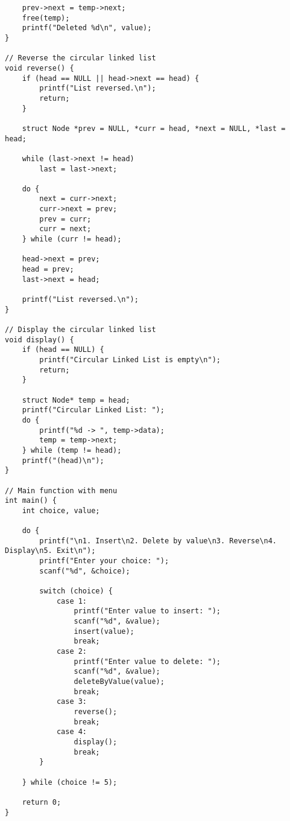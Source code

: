 \documentclass[12pt,a4paper]{article}
\begin{document}
\begin{lstlisting}
    prev->next = temp->next;
    free(temp);
    printf("Deleted %d\n", value);
}

// Reverse the circular linked list
void reverse() {
    if (head == NULL || head->next == head) {
        printf("List reversed.\n");
        return;
    }

    struct Node *prev = NULL, *curr = head, *next = NULL, *last = head;

    while (last->next != head)
        last = last->next;

    do {
        next = curr->next;
        curr->next = prev;
        prev = curr;
        curr = next;
    } while (curr != head);

    head->next = prev;
    head = prev;
    last->next = head;

    printf("List reversed.\n");
}

// Display the circular linked list
void display() {
    if (head == NULL) {
        printf("Circular Linked List is empty\n");
        return;
    }

    struct Node* temp = head;
    printf("Circular Linked List: ");
    do {
        printf("%d -> ", temp->data);
        temp = temp->next;
    } while (temp != head);
    printf("(head)\n");
}

// Main function with menu
int main() {
    int choice, value;

    do {
        printf("\n1. Insert\n2. Delete by value\n3. Reverse\n4. Display\n5. Exit\n");
        printf("Enter your choice: ");
        scanf("%d", &choice);

        switch (choice) {
            case 1:
                printf("Enter value to insert: ");
                scanf("%d", &value);
                insert(value);
                break;
            case 2:
                printf("Enter value to delete: ");
                scanf("%d", &value);
                deleteByValue(value);
                break;
            case 3:
                reverse();
                break;
            case 4:
                display();
                break;
        }

    } while (choice != 5);

    return 0;
}
\end{lstlisting}
\end{document}
